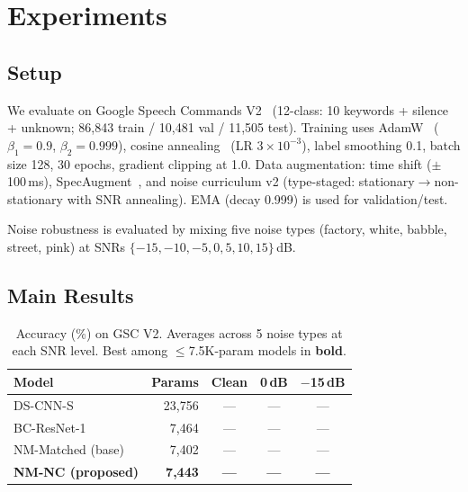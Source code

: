 \documentclass{Interspeech}
\begin{document}
\section{Experiments}

\subsection{Setup}

We evaluate on Google Speech Commands V2~\cite{warden2018speech} (12-class: 10 keywords + silence + unknown; 86,843 train / 10,481 val / 11,505 test).
Training uses AdamW~\cite{loshchilov2019adamw} ($\beta_1{=}0.9$, $\beta_2{=}0.999$), cosine annealing~\cite{loshchilov2017sgdr} (LR $3{\times}10^{-3}$), label smoothing 0.1, batch size 128, 30 epochs, gradient clipping at 1.0.
Data augmentation: time shift ($\pm$100\,ms), SpecAugment~\cite{park2019specaugment}, and noise curriculum v2 (type-staged: stationary$\to$non-stationary with SNR annealing).
EMA (decay 0.999) is used for validation/test.

Noise robustness is evaluated by mixing five noise types (factory, white, babble, street, pink) at SNRs $\{-15, -10, -5, 0, 5, 10, 15\}$\,dB.

\subsection{Main Results}

\begin{table}[t]
\centering
\caption{Accuracy (\%) on GSC V2. Averages across 5 noise types at each SNR level. Best among ${\leq}$7.5K-param models in \textbf{bold}.}
\label{tab:main}
\small
\setlength{\tabcolsep}{4pt}
\begin{tabular}{lrccc}
\toprule
\textbf{Model} & \textbf{Params} & \textbf{Clean} & \textbf{0\,dB} & $-$\textbf{15\,dB} \\
\midrule
DS-CNN-S~\cite{zhang2017hello} & 23,756 & --- & --- & --- \\
BC-ResNet-1~\cite{kim2021bcresnet} & 7,464 & --- & --- & --- \\
\midrule
NM-Matched (base) & 7,402 & --- & --- & --- \\
\textbf{NM-NC (proposed)} & \textbf{7,443} & \textbf{---} & \textbf{---} & \textbf{---} \\
\bottomrule
\end{tabular}
\end{table}
\end{document}

